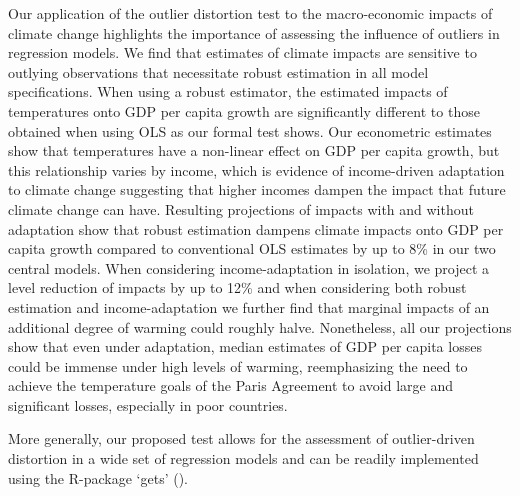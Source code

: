 \documentclass[11pt, letterpaper]{article}
\numberwithin{algorithm}{section}
\numberwithin{assumption}{section}
\numberwithin{lemma}{section}
\numberwithin{theorem}{section}
\numberwithin{corollary}{section}
\numberwithin{remark}{section}
\numberwithin{equation}{section}
\numberwithin{figure}{section}
\numberwithin{table}{section}
\begin{document}
Our application of the outlier distortion test to the macro-economic impacts of climate change highlights the importance of assessing the influence of outliers in regression models. We find that estimates of climate impacts are sensitive to outlying observations that necessitate robust estimation in all model specifications. When using a robust estimator, the estimated impacts of temperatures onto GDP per capita growth are significantly different to those obtained when using OLS as our formal test shows. Our econometric estimates show that temperatures have a non-linear effect on GDP per capita growth, but this relationship varies by income, which is evidence of income-driven adaptation to climate change suggesting that higher incomes dampen the impact that future climate change can have. Resulting projections of impacts with and without adaptation show that robust estimation dampens climate impacts onto GDP per capita growth compared to conventional OLS estimates by up to 8\% in our two central models. When considering income-adaptation in isolation, we project a level reduction of impacts by up to 12\% and when considering both robust estimation and income-adaptation we further find that marginal impacts of an additional degree of warming could roughly halve. Nonetheless, all our projections show that even under adaptation, median estimates of GDP per capita losses could be immense under high levels of warming, reemphasizing the need to achieve the temperature goals of the Paris Agreement to avoid large and significant losses, especially in poor countries.

More generally, our proposed test allows for the assessment of outlier-driven distortion in a wide set of regression models and can be readily implemented using the R-package `gets' (\citealt{pretis2018automated}).

\newpage
\linespread{1} \selectfont




\newpage
\appendix
\end{document}
